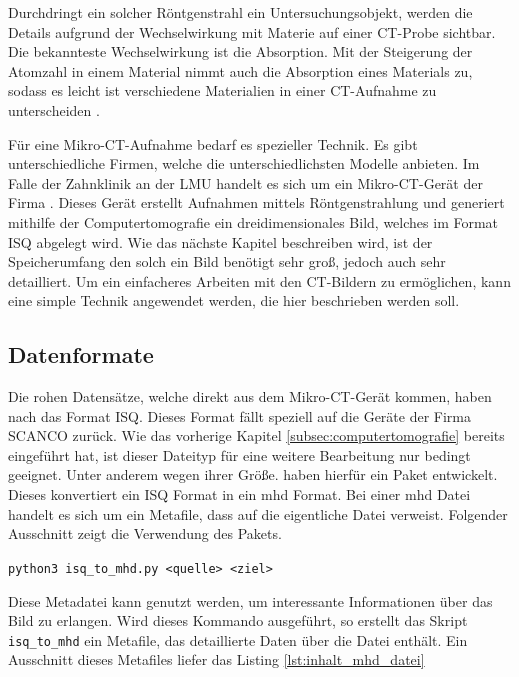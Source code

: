 Durchdringt ein solcher Röntgenstrahl ein Untersuchungsobjekt, werden die
Details aufgrund der Wechselwirkung mit Materie auf einer \ac{CT}-Probe sichtbar.
Die bekannteste Wechselwirkung ist die Absorption. Mit der Steigerung der Atomzahl
in einem Material nimmt auch die Absorption eines Materials zu, sodass es leicht
ist verschiedene Materialien in einer \ac{CT}-Aufnahme zu unterscheiden \citep[vgl.][K.~1]{nib2024}.

Für eine Mikro-\ac{CT}-Aufnahme bedarf es spezieller Technik. Es gibt
unterschiedliche Firmen, welche die unterschiedlichsten Modelle anbieten. Im
Falle der Zahnklinik an der \ac{LMU} handelt es sich um ein Mikro-\ac{CT}-Gerät
der Firma \citet{scanco2024}. Dieses Gerät erstellt Aufnahmen mittels
Röntgenstrahlung und generiert mithilfe der Computertomografie ein
dreidimensionales Bild, welches im Format \ac{ISQ} abgelegt wird. Wie das nächste
Kapitel beschreiben wird, ist der Speicherumfang den solch ein Bild benötigt
sehr groß, jedoch auch sehr detailliert. Um ein einfacheres Arbeiten mit den \ac{CT}-Bildern
zu ermöglichen, kann eine simple Technik angewendet werden, die hier beschrieben
werden soll.

\subsection{Datenformate}
\label{subsec:datensätze} Die rohen Datensätze, welche direkt aus dem Mikro-\ac{CT}-Gerät
kommen, haben nach \citet{scanco2024} das Format \ac{ISQ}. Dieses Format fällt speziell
auf die Geräte der Firma SCANCO zurück. Wie das vorherige Kapitel
\ref{subsec:computertomografie} bereits eingeführt hat, ist dieser Dateityp für eine
weitere Bearbeitung nur bedingt geeignet. Unter anderem wegen ihrer Größe. \citet{RoeschKunzelmann2018}
haben hierfür ein Paket entwickelt. Dieses konvertiert ein \ac{ISQ} Format in
ein \ac{mhd} Format. Bei einer \ac{mhd} Datei handelt es sich um ein Metafile,
dass auf die eigentliche Datei verweist. Folgender Ausschnitt zeigt die Verwendung
des Pakets.
\begin{center}
	\texttt{python3 isq\_to\_mhd.py <quelle> <ziel>}
\end{center}
Diese Metadatei kann genutzt werden, um interessante Informationen über das Bild
zu erlangen. Wird dieses Kommando ausgeführt, so erstellt das Skript \texttt{isq\_to\_mhd}
ein Metafile, das detaillierte Daten über die Datei enthält. Ein Ausschnitt
dieses Metafiles liefer das Listing \ref{lst:inhalt_mhd_datei}


